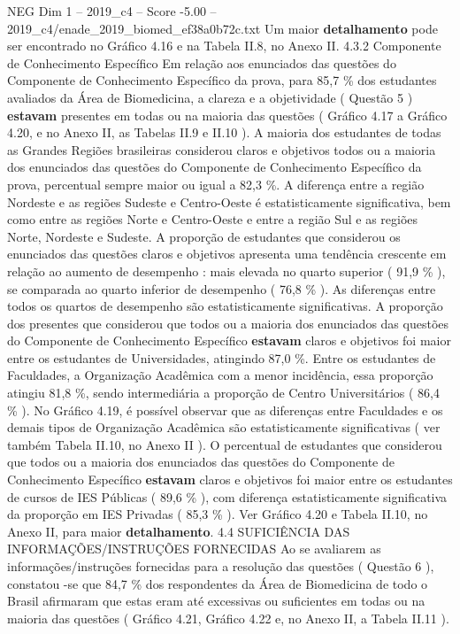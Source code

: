 \begin{textsample}{NEG Dim 1 – 2019\_c4 – Score -5.00 – 2019\_c4/enade\_2019\_biomed\_ef38a0b72c.txt}
Um maior \textbf{detalhamento} pode ser encontrado no Gráfico 4.16 e na Tabela II.8, no Anexo II. 4.3.2 Componente de Conhecimento Específico Em relação aos enunciados das questões do Componente de Conhecimento Específico da prova, para 85,7 \% dos estudantes avaliados da Área de Biomedicina, a clareza e a objetividade ( Questão 5 ) \textbf{estavam} presentes em todas ou na maioria das questões ( Gráfico 4.17 a Gráfico 4.20, e no Anexo II, as Tabelas II.9 e II.10 ).
A maioria dos estudantes de todas as Grandes Regiões brasileiras considerou claros e objetivos todos ou a maioria dos enunciados das questões do Componente de Conhecimento Específico da prova, percentual sempre maior ou igual a 82,3 \%.
A diferença entre a região Nordeste e as regiões Sudeste e Centro-Oeste é estatisticamente significativa, bem como entre as regiões Norte e Centro-Oeste e entre a região Sul e as regiões Norte, Nordeste e Sudeste.
A proporção de estudantes que considerou os enunciados das questões claros e objetivos apresenta uma tendência crescente em relação ao aumento de desempenho : mais elevada no quarto superior ( 91,9 \% ), se comparada ao quarto inferior de desempenho ( 76,8 \% ).
As diferenças entre todos os quartos de desempenho são estatisticamente significativas.
A proporção dos presentes que considerou que todos ou a maioria dos enunciados das questões do Componente de Conhecimento Específico \textbf{estavam} claros e objetivos foi maior entre os estudantes de Universidades, atingindo 87,0 \%.
Entre os estudantes de Faculdades, a Organização Acadêmica com a menor incidência, essa proporção atingiu 81,8 \%, sendo intermediária a proporção de Centro Universitários ( 86,4 \% ).
No Gráfico 4.19, é possível observar que as diferenças entre Faculdades e os demais tipos de Organização Acadêmica são estatisticamente significativas ( ver também Tabela II.10, no Anexo II ).
O percentual de estudantes que considerou que todos ou a maioria dos enunciados das questões do Componente de Conhecimento Específico \textbf{estavam} claros e objetivos foi maior entre os estudantes de cursos de IES Públicas ( 89,6 \% ), com diferença estatisticamente significativa da proporção em IES Privadas ( 85,3 \% ).
Ver Gráfico 4.20 e Tabela II.10, no Anexo II, para maior \textbf{detalhamento}. 4.4 SUFICIÊNCIA DAS INFORMAÇÕES/INSTRUÇÕES FORNECIDAS Ao se avaliarem as informações/instruções fornecidas para a resolução das questões ( Questão 6 ), constatou -se que 84,7 \% dos respondentes da Área de Biomedicina de todo o Brasil afirmaram que estas eram até excessivas ou suficientes em todas ou na maioria das questões ( Gráfico 4.21, Gráfico 4.22 e, no Anexo II, a Tabela II.11 ).

\end{textsample}
